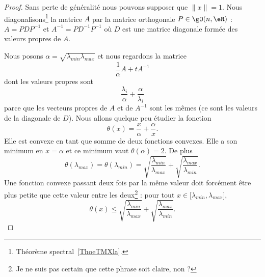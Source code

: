 \begin{proof}
    Sans perte de généralité nous pouvons supposer que \( \| x \|=1\). Nous diagonalisons\footnote{Théorème spectral~\ref{ThoeTMXla}.} la matrice \( A\) par la matrice orthogonale  \( P\in\gO(n,\eR)\) : \( A=PDP^{-1}\) et \( A^{-1}=PD^{-1}P^{-1}\) où \( D\) est  une matrice diagonale formée des valeurs propres de \( A\).

    Nous posons \( \alpha=\sqrt{\lambda_{min}\lambda_{max}}\) et nous regardons la matrice
    \begin{equation}
        \frac{1}{ \alpha }A+tA^{-1}
    \end{equation}
    dont les valeurs propres sont
    \begin{equation}
        \frac{ \lambda_i }{ \alpha }+\frac{ \alpha }{ \lambda_i }
    \end{equation}
    parce que les vecteurs propres de \( A\) et de \( A^{-1}\) sont les mêmes (ce sont les valeurs de la diagonale de \( D\)). Nous allons quelque peu étudier la fonction
    \begin{equation}
        \theta(x)=\frac{ x }{ \alpha }+\frac{ \alpha }{ x }.
    \end{equation}
    Elle est convexe en tant que somme de deux fonctions convexes. Elle a son minimum en \( x=\alpha\) et ce minimum vaut \( \theta(\alpha)=2\). De plus
    \begin{equation}
        \theta(\lambda_{max})=\theta(\lambda_{min})=\sqrt{\frac{ \lambda_{min} }{ \lambda_{max} }}+\sqrt{\frac{ \lambda_{max} }{ \lambda_{min} }}.
    \end{equation}
    Une fonction convexe passant deux fois par la même valeur doit forcément être plus petite que cette valeur entre les deux\footnote{Je ne suis pas certain que cette phrase soit claire, non ?} : pour tout \( x\in\mathopen[ \lambda_{min} , \lambda_{max} \mathclose]\),
    \begin{equation}
        \theta(x)\leq  \sqrt{\frac{ \lambda_{min} }{ \lambda_{max} }}+\sqrt{\frac{ \lambda_{max} }{ \lambda_{min} }}.
    \end{equation}


\end{proof}

